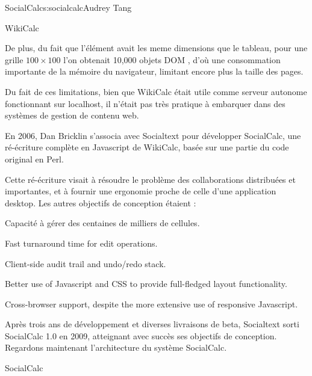 \begin{aosachapter}{SocialCalc}{s:socialcalc}{Audrey Tang}
\begin{aosasect1}{WikiCalc}

De plus, du fait que l'élément  avait les meme dimensions que le tableau, pour une grille $100{\times}100$ l'on obtenait 10,000 objets DOM , d'où une consommation importante de la mémoire du navigateur,
limitant encore plus la taille des pages.

Du fait de ces limitations, bien que WikiCalc était utile comme serveur autonome fonctionnant sur localhost, il n'était pas très pratique à embarquer dans des systèmes de gestion de contenu web.

En 2006, Dan  Bricklin s'associa avec Socialtext pour développer SocialCalc, une ré-écriture complète en Javascript de WikiCalc, basée sur une partie du code original en Perl. 

Cette ré-écriture visait à résoudre le problème des collaborations distribuées et importantes, et à fournir une ergonomie proche de celle d'une application desktop.  Les autres objectifs de conception étaient :

\begin{aosaitemize}

  \item Capacité à gérer des centaines de milliers de cellules.

  \item Fast turnaround time for edit operations.

  \item Client-side audit trail and undo/redo stack.

  \item Better use of Javascript and CSS to provide full-fledged layout
  functionality.

  \item Cross-browser support, despite the more extensive use of
  responsive Javascript.

\end{aosaitemize}

Après trois ans de développement et diverses livraisons de beta, Socialtext sorti SocialCalc 1.0 en 2009, atteignant avec succès ses objectifs de conception.  Regardons maintenant l'architecture du système SocialCalc.

\end{aosasect1}

\begin{aosasect1}{SocialCalc}


\end{aosasect1}
\end{aosachapter}
